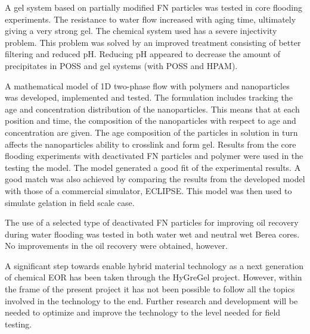 A gel system based on partially modified FN particles was tested in core flooding experiments. The resistance to water flow increased with aging time, ultimately giving a very strong gel. The chemical system used has a severe injectivity problem. This problem was solved by an improved treatment consisting of better filtering and reduced pH. Reducing pH appeared to decrease the amount of precipitates in POSS and gel systems (with POSS and HPAM).    

A mathematical model of 1D two-phase flow with polymers and nanoparticles was developed, implemented and tested. The formulation includes tracking the age and concentration distribution of the nanoparticles. This means that at each position and time, the composition of the nanoparticles with respect to age and concentration are given. The age composition of the particles in solution in turn affects the nanoparticles ability to crosslink and form gel. Results from the core flooding experiments with deactivated FN particles and polymer were used in the testing the model. The model generated a good fit of the experimental results. A good match was also achieved by comparing the results from the developed model with those of a commercial simulator, ECLIPSE. This model was then used to simulate gelation in field scale case.

The use of a selected type of deactivated FN particles for improving oil recovery during water flooding was tested in both water wet and neutral wet Berea cores. No improvements in the oil recovery were obtained, however.

A significant step towards enable hybrid material technology as a next generation of chemical EOR has been taken through the HyGreGel project. However, within the frame of the present project it has not been possible to follow all the topics involved in the technology to the end. Further research and development will be needed to optimize and improve the technology to the level needed for field testing.  
